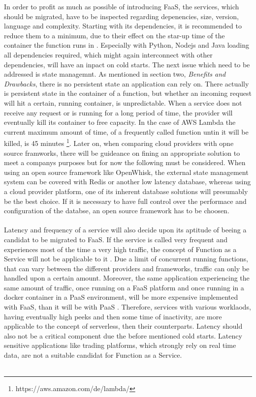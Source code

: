 \documentclass[11pt]{article}
\begin{document}
In order to profit as much as possible of introducing FaaS, the services, which should be migrated, have to be inspected regarding depenencies, size, version, language and complexity. Starting with its dependencies, it is recommended to reduce them to a minimum, due to their effect on the star-up time of the container the function runs in \cite{manner2018cold}. Especially with Python, Nodejs and Java \cite{puripunpinyo2017effect} loading all dependencies required, which might again interconnect with other dependencies, will have an inpact on cold starts. The next issue which need to be addressed is state managemnt. As mentioned in section two, \textit{Benefits and Drawbacks}, there is no persistent state an application can rely on. There actually is persistent state in the container of a function, but whether an incoming request will hit a certain, running container, is unpredictable. When a service does not receive any request or is running for a long period of time, the provider will eventually kill its container to free capacity. In the case of AWS Lambda the current maximum amount of time, of a frequently called function untin it will be killed, is 45 minutes \footnote{https://aws.amazon.com/de/lambda/}. Later on, when comparing cloud providers with opne source framworks, there will be guideance on fining an appropriate solution to meet a companys purposes but for now the following must be considered. When using an open source framework like OpenWhisk, the external state management system can be covered with Redis or another low latency database, whereas using a cloud provider platform, one of its inherent database solutions will presumably be the best choice. If it is necessary to have full control over the performace and configuration of the databse, an open source framework has to be choosen. \\\\
Latency and frequency of a service will also decide upon its aptitude of beeing a candidat to be migrated to FaaS. If the service is called very frequent and experiences most of the time a very high traffic, the concept of Function as a Service will not be applicable to it \cite{jonas2019cloud}. Due a limit of concurrent running functions, that can vary between the different providers and frameworks, traffic can only be handled upon a certain amount. Moreover, the same application experiencing the same amount of traffic, once running on a FaaS platform and once running in a docker container in a PaaS environment, will be more expensive implemented with FaaS, than it will be with PaaS \cite{jonas2019cloud}. Therefore, services with various worklaods, having eventually high peeks and then some time of inactivity, are more applicable to the concept of serverless, then their counterparts. Latency should also not be a critical component due the before mentioned cold starts. Latency sensitive applications like trading platforms, which strongly rely on real time data, are not a suitable candidat for Function as a Service. \\\\
\end{document}
